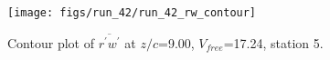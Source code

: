\begin{figure}[H]
\centering
\texttt{[image: figs/run\_42/run\_42\_rw\_contour]}
\caption{Contour plot of $\overline{r^\prime w^\prime}$ at $z/c$=9.00, $V_{free}$=17.24, station 5.}
\label{fig:run_42_rw_contour}
\end{figure}


